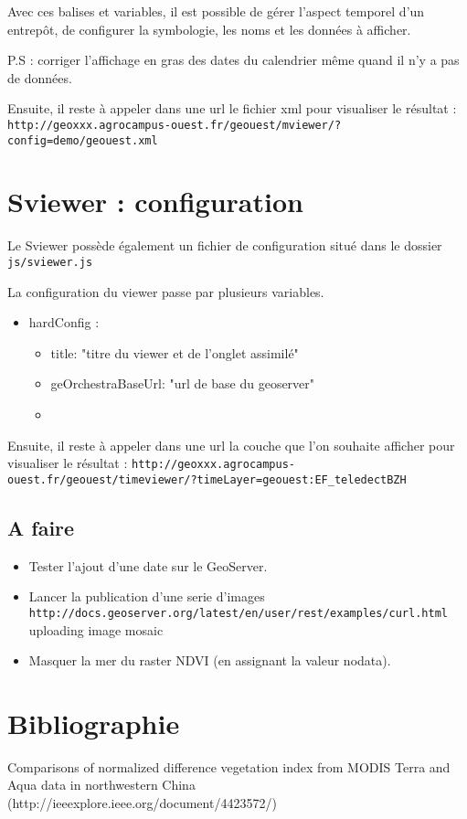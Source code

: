 \documentclass[10pt,a4paper]{article}
\begin{document}
Avec ces balises et variables, il est possible de gérer l'aspect temporel d'un entrepôt, de configurer la symbologie, les noms et les données à afficher.

P.S : corriger l'affichage en gras des dates du calendrier même quand il n'y a pas de données.

Ensuite, il reste à appeler dans une url le fichier xml pour visualiser le résultat : \verb!http://geoxxx.agrocampus-ouest.fr/geouest/mviewer/?config=demo/geouest.xml!

\section{Sviewer : configuration}
Le Sviewer possède également un fichier de configuration situé dans le dossier \verb!js/sviewer.js!

La configuration du viewer passe par plusieurs variables.
\begin{itemize}
\item hardConfig :
\begin{itemize}
\item title: "titre du viewer et de l'onglet assimilé"
\item geOrchestraBaseUrl: "url de base du geoserver"
\item 
\end{itemize}
\end{itemize}

Ensuite, il reste à appeler dans une url la couche que l'on souhaite afficher pour visualiser le résultat : \verb!http://geoxxx.agrocampus-ouest.fr/geouest/timeviewer/?timeLayer=geouest:EF_teledectBZH!

\subsection{A faire}
\begin{itemize}
\item Tester l'ajout d'une date sur le GeoServer.
\item Lancer la publication d'une serie d'images \verb!http://docs.geoserver.org/latest/en/user/rest/examples/curl.html! uploading image mosaic
\item Masquer la mer du raster NDVI (en assignant la valeur nodata).
\end{itemize}
\section{Bibliographie}

Comparisons of normalized difference vegetation index from MODIS Terra and Aqua data in northwestern China (http://ieeexplore.ieee.org/document/4423572/)
\end{document}
